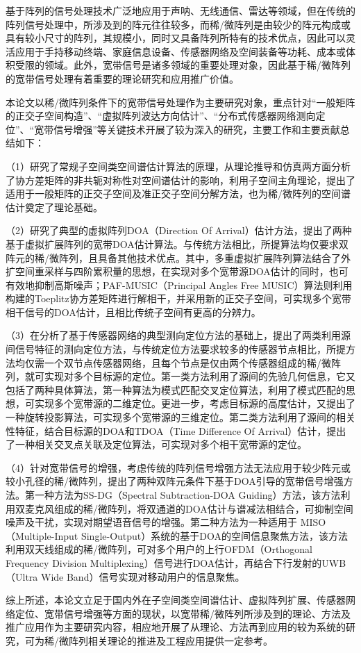 
\begin{CHSabstract}
	基于阵列的信号处理技术广泛地应用于声呐、无线通信、雷达等领域，但在传统的阵列信号处理中，所涉及到的阵元往往较多，而稀/微阵列是由较少的阵元构成或具有较小尺寸的阵列，其规模小，同时又具备阵列所特有的技术优点，因此可以灵活应用于手持移动终端、家庭信息设备、传感器网络及空间装备等功耗、成本或体积受限的领域。此外，宽带信号是诸多领域的重要处理对象，因此基于稀/微阵列的宽带信号处理有着重要的理论研究和应用推广价值。


	本论文以稀/微阵列条件下的宽带信号处理作为主要研究对象，重点针对“一般矩阵的正交子空间构造”、“虚拟阵列波达方向估计”、“分布式传感器网络测向定位”、“宽带信号增强”等关键技术开展了较为深入的研究，主要工作和主要贡献总结如下：


	（1）研究了常规子空间类空间谱估计算法的原理，从理论推导和仿真两方面分析了协方差矩阵的非共轭对称性对空间谱估计的影响，利用子空间主角理论，提出了适用于一般矩阵的正交子空间及准正交子空间分解方法，也为稀/微阵列的空间谱估计奠定了理论基础。


	（2）研究了典型的虚拟阵列DOA（Direction Of Arrival）估计方法，提出了两种基于虚拟扩展阵列的宽带DOA估计算法。与传统方法相比，所提算法均仅要求双阵元的稀/微阵列，且具备其他技术优点。其中，多重虚拟扩展阵列算法结合了外扩空间重采样与四阶累积量的思想，在实现对多个宽带源DOA估计的同时，也可有效地抑制高斯噪声；PAF-MUSIC（Principal Angles Free MUSIC）算法则利用构建的Toeplitz协方差矩阵进行解相干，并采用新的正交子空间，可实现多个宽带相干信号的DOA估计，且相比传统子空间有更高的分辨力。


	（3）在分析了基于传感器网络的典型测向定位方法的基础上，提出了两类利用源间信号特征的测向定位方法，与传统定位方法要求较多的传感器节点相比，所提方法均仅需一个双节点传感器网络，且每个节点是仅由两个传感器组成的稀/微阵列，就可实现对多个目标源的定位。第一类方法利用了源间的先验几何信息，它又包括了两种具体算法，第一种算法为模式匹配交叉定位算法，利用了模式匹配的思想，可实现多个宽带源的二维定位。更进一步，考虑目标源的高度估计，又提出了一种旋转投影算法，可实现多个宽带源的三维定位。第二类方法利用了源间的相关性特征，结合目标源的DOA和TDOA（Time Difference Of Arrival）估计，提出了一种相关交叉点关联及定位算法，可实现对多个相干宽带源的定位。


	（4）针对宽带信号的增强，考虑传统的阵列信号增强方法无法应用于较少阵元或较小孔径的稀/微阵列，提出了两种双阵元条件下基于DOA引导的宽带信号增强方法。第一种方法为SS-DG（Spectral Subtraction-DOA Guiding）方法，该方法利用双麦克风组成的稀/微阵列，将双通道的DOA估计与谱减法相结合，可抑制空间噪声及干扰，实现对期望语音信号的增强。第二种方法为一种适用于 MISO（Multiple-Input Single-Output）系统的基于DOA的空间信息聚焦方法，该方法利用双天线组成的稀/微阵列，可对多个用户的上行OFDM（Orthogonal Frequency Division Multiplexing）信号进行DOA估计，再结合下行发射的UWB（Ultra Wide Band）信号实现对移动用户的信息聚焦。


	综上所述，本论文立足于国内外在子空间类空间谱估计、虚拟阵列扩展、传感器网络定位、宽带信号增强等方面的现状，以宽带稀/微阵列所涉及到的理论、方法及推广应用作为主要研究内容，相应地开展了从理论、方法再到应用的较为系统的研究，可为稀/微阵列相关理论的推进及工程应用提供一定参考。

\end{CHSabstract}
